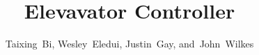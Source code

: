 \documentclass[journal]{IEEEtran}
\begin{document}
%
\title{Elevavator Controller}
%
%
%

\author{Taixing~Bi, Wesley~Eledui, Justin~Gay, and~John~Wilkes}%

% 
%



% 




\end{document}
